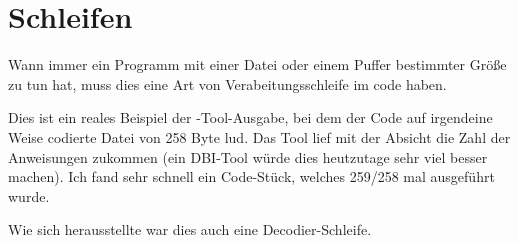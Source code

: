\section{Schleifen}

Wann immer ein Programm mit einer Datei oder einem Puffer bestimmter Größe
zu tun hat, muss dies eine Art von Verabeitungsschleife im code haben.


Dies ist ein reales Beispiel der \tracer-Tool-Ausgabe, bei dem der Code auf
irgendeine Weise codierte Datei von 258 Byte lud.
Das Tool lief mit der Absicht die Zahl der Anweisungen zukommen
(ein \ac{DBI}-Tool würde dies heutzutage sehr viel besser machen).
Ich fand sehr schnell ein Code-Stück, welches 259/258 mal ausgeführt wurde.



Wie sich herausstellte war dies auch eine Decodier-Schleife.
